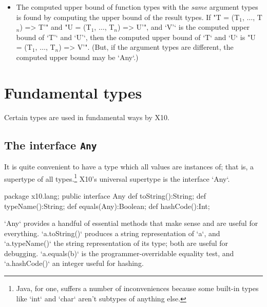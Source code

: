 {\begin{itemize}
\item The computed upper bound of function types with the {\em same} argument
      types is found by computing the upper bound of the result types.  
      If 
      \xcdmath"T = (T$_1$, $\ldots$, T$_n$) => T'"
      and 
      \xcdmath"U = (T$_1$, $\ldots$, T$_n$) => U'", 
      and \xcd`V'` is the computed upper bound of \xcd`T'` and \xcd`U'`, 
      then the computed upper bound of \xcd`T` and \xcd`U` is 
      \xcdmath"U = (T$_1$, $\ldots$, T$_n$) => V'".
      (But, if the argument types are different, the computed upper bound may
      be \xcd`Any`.)

\end{itemize}


\section{Fundamental types}

Certain types are used in fundamental ways by X10.  

\subsection{The interface {\tt Any}}

It is quite convenient to have a type which all values are instances of; that
is, a supertype of all types.\footnote{Java, for one, suffers a number of
  inconveniences because some built-in types like \xcd`int` and \xcd`char`
  aren't subtypes of anything else.}  X10's universal supertype is the
  interface \xcd`Any`. 

\begin{xten}
package x10.lang;
public interface Any {
  def toString():String;
  def typeName():String;
  def equals(Any):Boolean;
  def hashCode():Int;
}
\end{xten}

\xcd`Any` provides a handful of essential methods that make sense and are
useful for everything. \xcd`a.toString()` produces a
string representation of \xcd`a`, and \xcd`a.typeName()` the string
representation of its type; both are useful for debugging.  \xcd`a.equals(b)`
is the programmer-overridable equality test, and \xcd`a.hashCode()` an integer
useful for hashing.  


}
